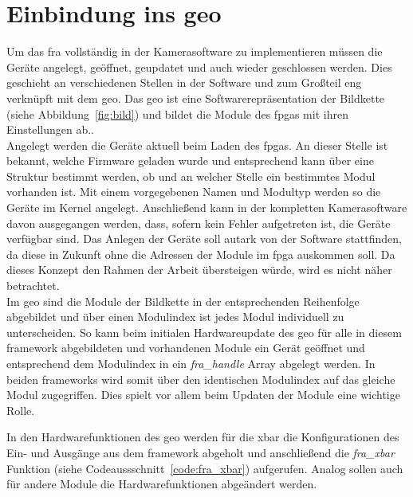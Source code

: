\section{Einbindung ins \acl{geo}}\label{sec:soft}
Um das \ac{fra} vollständig in der Kamerasoftware zu implementieren müssen die Geräte angelegt, geöffnet, geupdatet und auch wieder geschlossen werden. Dies geschieht an verschiedenen Stellen in der Software und zum Großteil eng verknüpft mit dem \ac{geo}. Das \ac{geo} ist eine Softwarerepräsentation der Bildkette (siehe Abbildung~\ref{fig:bild}) und bildet die Module des \ac{fpga}s mit ihren Einstellungen ab..\\


Angelegt werden die Geräte aktuell beim Laden des \ac{fpga}s. An dieser Stelle ist bekannt, welche Firmware geladen wurde und entsprechend kann über eine Struktur bestimmt werden, ob und an welcher Stelle ein bestimmtes Modul vorhanden ist. Mit einem vorgegebenen Namen und Modultyp werden so die Geräte im Kernel angelegt. Anschließend kann in der kompletten Kamerasoftware davon ausgegangen werden, dass, sofern kein Fehler aufgetreten ist, die Geräte verfügbar sind. Das Anlegen der Geräte soll autark von der Software stattfinden, da diese in Zukunft ohne die Adressen der Module im \ac{fpga} auskommen soll. Da dieses Konzept den Rahmen der Arbeit übersteigen würde, wird es nicht näher betrachtet. \\

Im \ac{geo} sind die Module der Bildkette in der entsprechenden Reihenfolge abgebildet und über einen Modulindex ist jedes Modul individuell zu unterscheiden. So kann beim initialen Hardwareupdate des \ac{geo} für alle in diesem \gls{framework} abgebildeten und vorhandenen Module ein Gerät geöffnet und entsprechend dem Modulindex in ein \textit{fra\_handle} Array abgelegt werden. In beiden \glspl{framework} wird somit über den identischen Modulindex auf das gleiche Modul zugegriffen. Dies spielt vor allem beim Updaten der Module eine wichtige Rolle.


In den Hardwarefunktionen des \ac{geo} werden für die \ac{xbar} die Konfigurationen des Ein- und Ausgänge aus dem \gls{framework} abgeholt und anschließend die \textit{fra\_xbar} Funktion (siehe Codeaussschnitt~\ref{code:fra_xbar}) aufgerufen. Analog sollen auch für andere Module die Hardwarefunktionen abgeändert werden.








